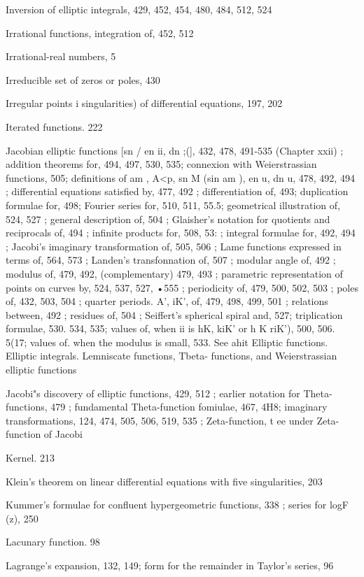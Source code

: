Inversion of elliptic integrals, 429, 452, 454, 480, 484, 512, 524

Irrational functions, integration of, 452, 512

Irrational-real numbers, 5

%
%

Irreducible set of zeros or poles, 430

Irregular points i singularities) of differential equations, 197, 202

Iterated functions. 222

Jacobian elliptic functions [sn /  en ii, dn ;(], 432, 478, 491-535 (Chapter xxii) ; addition theorems
for, 494, 497, 530, 535; connexion with Weierstrassian functions, 505; definitions of am  ,
A<p, sn M (sin am  ), en u, dn u, 478, 492, 494 ; differential equations satisfied by, 477, 492 ;
differentiation of, 493; duplication formulae for, 498; Fourier series for, 510, 511, 55.5;
geometrical illustration of, 524, 527 ; general description of, 504 ; Glaisher's notation for
quotients and reciprocals of, 494 ; infinite products for, 508, 53:  ; integral formulae for, 492,
494 ; Jacobi's imaginary transformation of, 505, 506 ; Lame functions expressed in terms of,
564, 573 ; Landen's transfonnation of, 507 ; modular angle of, 492 ; modulus of, 479, 492,
(complementary) 479, 493 ; parametric representation of points on curves by, 524, 537, 527,
•555 ; periodicity of, 479, 500, 502, 503 ; poles of, 432, 503, 504 ; quarter periods. A', iK', of,
479, 498, 499, 501 ; relations between, 492 ; residues of, 504 ; Seiffert's spherical spiral and,
527; triplication formulae, 530. 534, 535; values of, when ii is hK, kiK' or h  K riK'), 500,
506. 5(17; values of. when the modulus is small, 533. See ahit Elliptic functions. Elliptic
integrals. Lemniscate functions, Tbeta- functions, and Weierstrassian elliptic functions

Jacobi"s discovery of elliptic functions, 429, 512 ; earlier notation for Theta-functions, 479 ;
fundamental Theta-function fomiulae, 467, 4H8; imaginary transformations, 124, 474, 505,
506, 519, 535 ; Zeta-function, t ee under Zeta-function of Jacobi

Kernel. 213

Klein's theorem on linear differential equations with five singularities, 203

Kummer's formulae for confluent hypergeometric functions, 338 ; series for logF (z), 250

Lacunary function. 98

Lagrange's expansion, 132, 149; form for the remainder in Taylor's series, 96

